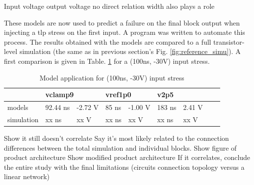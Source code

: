 Input voltage output voltage no direct relation
width also plays a role

These models are now used to predict a failure on the final block output when injecting a \gls{tlp} stress on the first input.
A program was written to automate this process.
The results obtained with the models are compared to a full transistor-level simulation (the same as in previous section's Fig. \ref{fig:reference_simu}).
A first comparison is given in Table. \ref{tab:model-v2-vs-sim} for a (100ns, -30V) input stress.

\begin{table}[!h]
\centering
\begin{tabular}{@{}lllllllll@{}}
           & \multicolumn{2}{l}{vclamp9} & \multicolumn{2}{l}{vref1p0} & \multicolumn{2}{l}{v2p5} \\
\toprule
models     & 92.44 ns      & -2.72 V     & 85 ns       & -1.00 V       & 183 ns      & 2.41 V     \\
simulation & xx ns         & xx V        & xx ns       & xx V          & xx ns       & xx V
\end{tabular}
\caption{Model application for (100ns, -30V) input stress}
\label{tab:model-v2-vs-sim}
\end{table}


%
Show it still doesn't correlate
Say it's most likely related to the connection differences between the total simulation and individual blocks.
Show figure of product architecture
Show modified product architecture
If it correlates, conclude the entire study with the final limitations (circuits connection topology versus a linear network)
